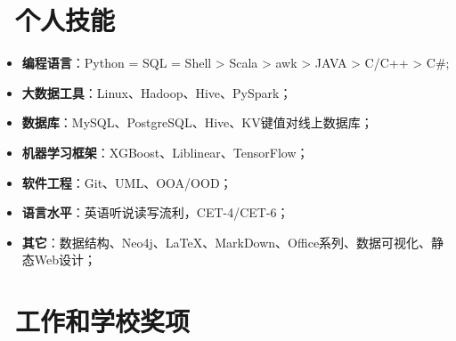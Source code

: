 \documentclass{resume}
\begin{document}
\section{   \faCogs    \  个人技能}

\begin{itemize}  [parsep=0.5ex]

   \item   \textbf{编程语言}：Python = SQL = Shell > Scala > awk > JAVA > C/C++ > C\#;
   \item    \textbf{大数据工具}：Linux、Hadoop、Hive、PySpark；
   \item    \textbf{数据库}：MySQL、PostgreSQL、Hive、KV键值对线上数据库；
   \item    \textbf{机器学习框架}：XGBoost、Liblinear、TensorFlow；
   \item    \textbf{软件工程}：Git、UML、OOA/OOD；
   \item    \textbf{语言水平}：英语听说读写流利，CET-4/CET-6；
   \item    \textbf{其它}：数据结构、Neo4j、LaTeX、MarkDown、Office系列、数据可视化、静态Web设计；
 
\end{itemize}

\medskip










\section{   \faTrophy   \ 工作和学校奖项}
\end{document}
